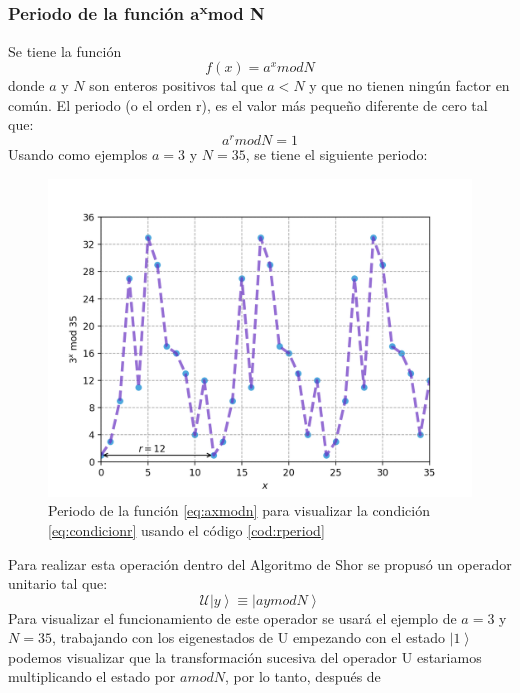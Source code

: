 \subsubsection{Periodo de la función a\textsuperscript{x}mod N}
Se tiene la función \begin{equation}
    f(x)=a^x mod N
    \label{eq:axmodn}
\end{equation}
donde $a$ y $N$ son enteros positivos tal que $a<N$ y que no tienen ningún factor en común. El periodo (o el orden r), es el valor más pequeño 
diferente de cero tal que:
\begin{equation}
    a^r mod N =1
    \label{eq:condicionr}
\end{equation}
Usando como ejemplos $a=3$ y $N=35$, se tiene el siguiente periodo:
\begin{figure}[H]
    \centering
    \includegraphics[scale=0.65]{../Graphics/period.png}
    \caption{Periodo de la función \ref{eq:axmodn} para visualizar la condición \ref{eq:condicionr} usando el código \ref{cod:rperiod}}
    \label{fig:condicionr}
\end{figure}
Para realizar esta operación dentro del Algoritmo de Shor se propusó un operador unitario tal que:
\begin{equation}
    \mathcal{U} \left| y \right\rangle \equiv \left| ay mod N \right\rangle 
    \label{eq:umod}
\end{equation}
Para visualizar el funcionamiento de este operador se usará el ejemplo de $a=3$ y $N=35$, trabajando con los eigenestados de U empezando con el estado 
$\left|1\right\rangle$ podemos visualizar que la transformación sucesiva del operador U estariamos multiplicando el estado por $amodN$, por lo tanto, después de
